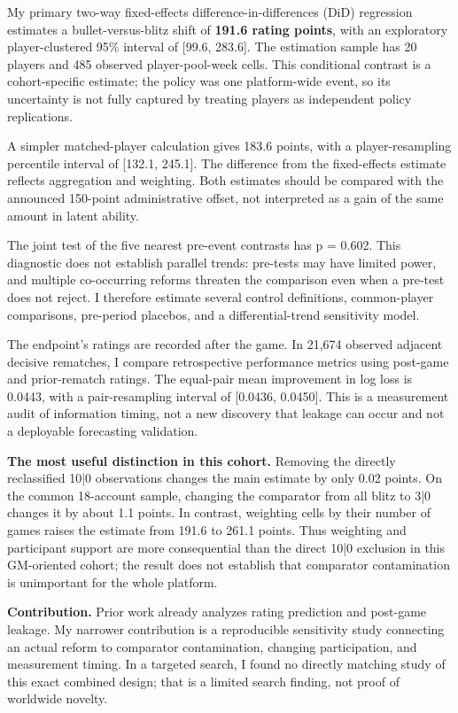 \documentclass[11pt,a4paper]{article}
\begin{document}
My primary two-way fixed-effects difference-in-differences (DiD) regression estimates a bullet-versus-blitz shift of \textbf{191.6 rating points}, with an exploratory player-clustered 95\% interval of [99.6, 283.6]. The estimation sample has 20 players and 485 observed player-pool-week cells. This conditional contrast is a cohort-specific estimate; the policy was one platform-wide event, so its uncertainty is not fully captured by treating players as independent policy replications.

A simpler matched-player calculation gives 183.6 points, with a player-resampling percentile interval of [132.1, 245.1]. The difference from the fixed-effects estimate reflects aggregation and weighting. Both estimates should be compared with the announced 150-point administrative offset, not interpreted as a gain of the same amount in latent ability.

The joint test of the five nearest pre-event contrasts has p = 0.602. This diagnostic does not establish parallel trends: pre-tests may have limited power, and multiple co-occurring reforms threaten the comparison even when a pre-test does not reject. I therefore estimate several control definitions, common-player comparisons, pre-period placebos, and a differential-trend sensitivity model.

The endpoint's ratings are recorded after the game. In 21,674 observed adjacent decisive rematches, I compare retrospective performance metrics using post-game and prior-rematch ratings. The equal-pair mean improvement in log loss is 0.0443, with a pair-resampling interval of [0.0436, 0.0450]. This is a measurement audit of information timing, not a new discovery that leakage can occur and not a deployable forecasting validation.

\textbf{The most useful distinction in this cohort.} Removing the directly reclassified 10|0 observations changes the main estimate by only 0.02 points. On the common 18-account sample, changing the comparator from all blitz to 3|0 changes it by about 1.1 points. In contrast, weighting cells by their number of games raises the estimate from 191.6 to 261.1 points. Thus weighting and participant support are more consequential than the direct 10|0 exclusion in this GM-oriented cohort; the result does not establish that comparator contamination is unimportant for the whole platform.

\textbf{Contribution.} Prior work already analyzes rating prediction and post-game leakage. My narrower contribution is a reproducible sensitivity study connecting an actual reform to comparator contamination, changing participation, and measurement timing. In a targeted search, I found no directly matching study of this exact combined design; that is a limited search finding, not proof of worldwide novelty.
\end{document}

